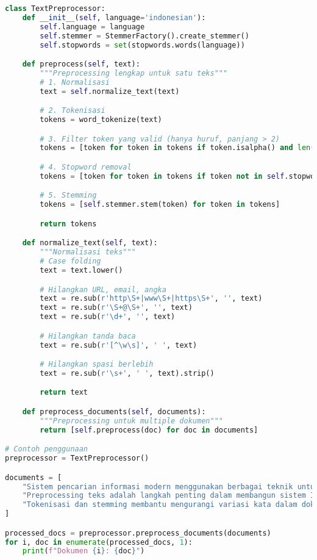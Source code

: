 \begin{lstlisting}[language=python, style=python]
class TextPreprocessor:
    def __init__(self, language='indonesian'):
        self.language = language
        self.stemmer = StemmerFactory().create_stemmer()
        self.stopwords = set(stopwords.words(language))

    def preprocess(self, text):
        """Preprocessing lengkap untuk satu teks"""
        # 1. Normalisasi
        text = self.normalize_text(text)

        # 2. Tokenisasi
        tokens = word_tokenize(text)

        # 3. Filter token yang valid (hanya huruf, panjang > 2)
        tokens = [token for token in tokens if token.isalpha() and len(token) > 2]

        # 4. Stopword removal
        tokens = [token for token in tokens if token not in self.stopwords]

        # 5. Stemming
        tokens = [self.stemmer.stem(token) for token in tokens]

        return tokens

    def normalize_text(self, text):
        """Normalisasi teks"""
        # Case folding
        text = text.lower()

        # Hilangkan URL, email, angka
        text = re.sub(r'http\S+|www\S+|https\S+', '', text)
        text = re.sub(r'\S+@\S+', '', text)
        text = re.sub(r'\d+', '', text)

        # Hilangkan tanda baca
        text = re.sub(r'[^\w\s]', ' ', text)

        # Hilangkan spasi berlebih
        text = re.sub(r'\s+', ' ', text).strip()

        return text

    def preprocess_documents(self, documents):
        """Preprocessing untuk multiple dokumen"""
        return [self.preprocess(doc) for doc in documents]

# Contoh penggunaan
preprocessor = TextPreprocessor()

documents = [
    "Sistem pencarian informasi modern menggunakan berbagai teknik untuk meningkatkan relevansi hasil pencarian.",
    "Preprocessing teks adalah langkah penting dalam membangun sistem IR yang efektif dan akurat.",
    "Tokenisasi dan stemming membantu mengurangi variasi kata dalam dokumen sehingga pencarian lebih efisien."
]

processed_docs = preprocessor.preprocess_documents(documents)
for i, doc in enumerate(processed_docs, 1):
    print(f"Dokumen {i}: {doc}")
\end{lstlisting}

